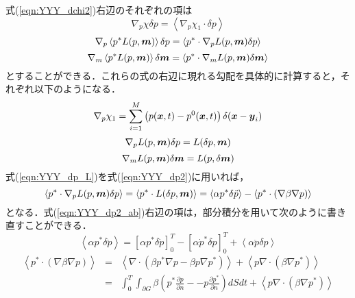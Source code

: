 式(\ref{eqn:YYY_dchi2})右辺のそれぞれの項は
\begin{equation}
	\nabla_p \chi \delta p
	=  
	\left< \nabla_p \chi_1\cdot \delta p \right> 
	\label{eqn:YYY_dp1}
\end{equation}
\begin{equation}
	\nabla_p \left< p^*  L(p,\mbox{\boldmath $m$}) \right> \delta p
	=  
	\left< p^*  \cdot \nabla_p L(p,\mbox{\boldmath $m$})\delta p \right> 
	\label{eqn:YYY_dp2}
\end{equation}
\begin{equation}
	\nabla_m \left< p^*  L(p,\mbox{\boldmath $m$}) \right> \delta \mbox{\boldmath $m$}
	=
	\left< p^*  \cdot \nabla_m L(p,\mbox{\boldmath $m$}) \delta \mbox{\boldmath $m$}\right> 
	\label{eqn:YYY_dm3}
\end{equation}
とすることができる．これらの式の右辺に現れる勾配を具体的に計算すると，それぞれ以下のようになる．
\begin{equation}
	\nabla_p \chi_1 =
	\sum_{i=1}^M \left(p(\mbox{\boldmath $x$},t)-p^0(\mbox{\boldmath $x$},t)\right) \delta(\mbox{\boldmath $x$}-\mbox{\boldmath $y$}_i)
	\label{eqn:YYY_dm_chi1}
\end{equation}
\begin{equation}
	\nabla_p L(p,\mbox{\boldmath $m$})\delta p 
	=
	L(\delta p,\mbox{\boldmath $m$})
	\label{eqn:YYY_dp_L}
\end{equation}
\begin{equation}
	\nabla_m L(p,\mbox{\boldmath $m$})\delta \mbox{\boldmath $m$} 
	=
	L(p,\delta \mbox{\boldmath $m$})
	\label{eqn:YYY_dm_L}
\end{equation}
式(\ref{eqn:YYY_dp_L})を式(\ref{eqn:YYY_dp2})に用いれば，
\begin{equation}
	\left< p^*  \cdot \nabla_p L(p,\mbox{\boldmath $m$})\delta p \right> 
	=
	\left< p^*  \cdot L(\delta p,\mbox{\boldmath $m$}) \right> 
	=
	\left<
		\alpha p^*\delta\ddot{p}
	\right>
	-
	\left<
		p^* \cdot \left( \nabla \beta \nabla p\right)
	\right>
	\label{eqn:YYY_dp2_ab}
\end{equation}
となる．式(\ref{eqn:YYY_dp2_ab})右辺の項は，部分積分を用いて次のように書き直すことができる．
\begin{equation}
	\left<
		\alpha p^*\delta\ddot{p}
	\right>
	=
	\left[ 
		\alpha p^* \delta \dot{p}	
	\right]_0^T
	-
	\left[ 
		\alpha \dot{p}^* \delta p	
	\right]_0^T
	+
	\left< \alpha\ddot{p} \delta p \right>
	\label{eqn:YYY_08}
\end{equation}
\begin{eqnarray}
	\left<
		p^* \cdot \left( \nabla \beta \nabla p\right)
	\right>
	&=&
	\left<
		\nabla\cdot
		\left( \beta p^*\nabla p -\beta p \nabla p^* \right)
	\right>
	+
	\left<
		p \nabla\cdot \left( \beta \nabla p^* \right)
	\right> \\
	\label{eqn:YYY_09}
	&=&
	\int_0^T\int_{\partial G}
	\beta\left( 
		p^* \frac{\partial p}{\partial n}
		-
		-p \frac{\partial p^*}{\partial n}
	\right)
	dS
	dt
	+
	\left<
		p \nabla\cdot \left( \beta \nabla p^* \right)
	\right>
	\label{eqn:YYY_10}
\end{eqnarray}

